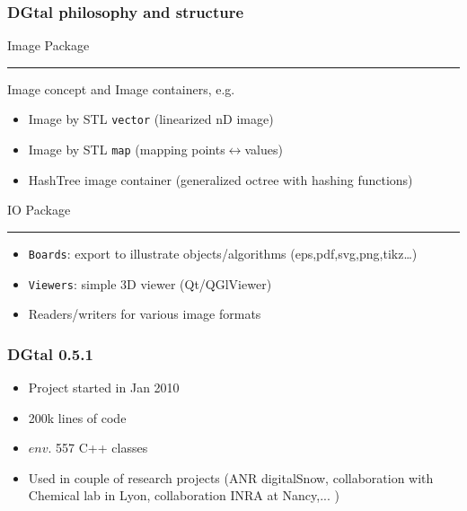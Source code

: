 \documentclass[8pt]{beamer}
\newcommand{\HH}{ \vspace{0.5pt}\hrule}
\begin{document}
\begin{frame}
  \frametitle{DGtal philosophy and structure}

  \begin{alertblock}{\centering Image Package\HH}
    Image concept and Image containers, e.g.
    \begin{itemize}
    \item Image by STL \texttt{vector} (linearized nD image)
    \item Image by STL \texttt{map} (mapping points$\leftrightarrow$values)
    \item HashTree image container (generalized octree with hashing functions)
    \end{itemize}
  \end{alertblock}
  

  \begin{alertblock}{\centering IO Package\HH}
    \small
    \begin{itemize}
    \item \texttt{Boards}: export to illustrate objects/algorithms (eps,pdf,svg,png,tikz\ldots)  
    \item \texttt{Viewers}:  simple 3D viewer (Qt/QGlViewer)
    \item Readers/writers for various image formats
    \end{itemize}
  \end{alertblock}
\end{frame}
\begin{frame}%
  \frametitle{DGtal 0.5.1}

\begin{itemize}
\item Project started in Jan 2010
\item 200k lines of code
\item $env.$ 557 C++ classes 
\item Used in couple of research projects (ANR digitalSnow,
  collaboration with Chemical lab in Lyon, collaboration INRA  at Nancy,... )
\end{itemize}
  
\end{frame}


\end{document}
